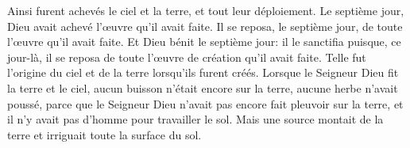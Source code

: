 Ainsi furent achevés le ciel et la terre, et tout leur déploiement.
Le septième jour, Dieu avait achevé l’œuvre qu’il avait faite.
Il se reposa, le septième jour, de toute l’œuvre qu’il avait faite.
Et Dieu bénit le septième jour: il le sanctifia puisque, ce jour-là,
	il se reposa de toute l’œuvre de création qu’il avait faite.
Telle fut l’origine du ciel et de la terre lorsqu’ils furent créés.
Lorsque le Seigneur Dieu fit la terre et le ciel,
	aucun buisson n’était encore sur la terre, aucune herbe n’avait poussé,
	parce que le Seigneur Dieu n’avait pas encore fait pleuvoir sur la terre,
	et il n’y avait pas d’homme pour travailler le sol.
Mais une source montait de la terre et irriguait toute la surface du sol.
